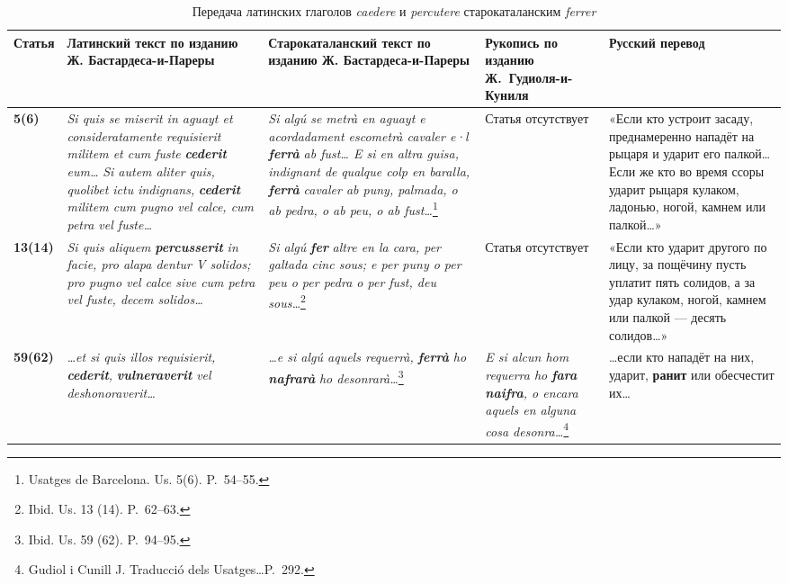 \begin{center}
\small
\setlength{\tabcolsep}{2pt}
\begin{longtable}{|p{}|p{}|p{}|p{}|p{}|}
\caption{Передача латинских глаголов \emph{caedere} и \emph{percutere} старокаталанским \emph{ferrer}}\label{tab:ch2-ferrer}\\
\hline
\textbf{Статья} & \textbf{Латинский текст по изданию Ж. Бастардеса-и-Пареры} & \textbf{Старокаталанский текст по изданию Ж. Бастардеса-и-Пареры} & \textbf{Рукопись по изданию Ж.}\textbf{~}\textbf{Гудиоля-и-Куниля} & \textbf{Русский перевод} \\ \hline
\textbf{5(6)} & \emph{Si quis se miserit in aguayt et consideratamente requisierit militem et cum fuste }\textbf{\emph{cederit}}\emph{ }\emph{eum… }\emph{Si autem aliter quis, quolibet ictu indignans, }\textbf{\emph{cederit }}\emph{militem cum pugno vel calce, cum petra vel fuste…} & \emph{Si algú se metrà en aguayt e acordadament escometrà cavaler e·l }\textbf{\emph{ferrà}}\emph{ ab fust… E si en altra guisa, indignant de }\emph{qualque colp en baralla, }\textbf{\emph{ferrà }}\emph{cavaler ab puny, palmada, o ab pedra, o ab peu, o ab fust…}\footnote{Usatges de Barcelona. Us. 5(6). P.~54--55.} & Статья отсутствует & «Если кто устроит засаду, преднамеренно нападёт на рыцаря и ударит его палкой… Если же кто во время ссоры ударит рыцаря кулаком, ладонью, ногой, камнем или палкой…» \\ \hline
\textbf{13(14)} & \emph{Si quis aliquem }\textbf{\emph{percusserit}}\emph{ in facie, pro alapa dentur V solidos; pro pugno vel calce sive cum petra vel fuste, decem solidos…} & \emph{Si algú }\textbf{\emph{fer}}\emph{ altre en la cara, per galtada cinc sous; e per puny o per peu o per pedra o per fust, deu sous…}\footnote{Ibid. Us. 13 (14). P.~62--63.} & Статья отсутствует & «Если кто ударит другого по лицу, за пощёчину пусть уплатит пять солидов, а за удар кулаком, ногой, камнем или палкой --- десять солидов…» \\ \hline
\textbf{59(62)} & \emph{…et si quis illos requisierit, }\textbf{\emph{cederit}}\emph{, }\textbf{\emph{vulneraverit }}\emph{vel deshonoraverit…} & \emph{…e si algú aquels requerrà, }\textbf{\emph{ferrà}}\emph{ ho }\textbf{\emph{nafrarà}}\emph{ ho desonrarà…}\footnote{Ibid. Us. 59 (62). P.~94--95.} & \emph{E si alcun hom requerra ho }\textbf{\emph{fara}}\emph{ }\textbf{\emph{naifra}}\emph{, o encara aquels en alguna cosa desonra…}\footnote{Gudiol i Cunill J. Traducció dels Usatges…P.~292.} & …если кто нападёт на них, ударит, \textbf{ранит} или обесчестит их… \\ \hline

\end{longtable}
\end{center}
